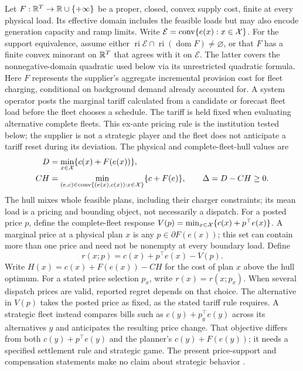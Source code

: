Let $F:\mathbb R^T\to\mathbb R\cup\{+\infty\}$ be a proper, closed, convex supply cost,
finite at every physical load.  Its effective domain includes the feasible
loads but may also encode generation capacity and ramp limits.  Write
$\mathcal E=\operatorname{conv}\{e(x):x\in\mathcal X\}$.  For the support
equivalence, assume either
$\operatorname{ri}\mathcal E\cap\operatorname{ri}(\operatorname{dom}F)
\ne\varnothing$, or that $F$ has a finite convex minorant on $\mathbb R^T$ that
agrees with it on $\mathcal E$.  The latter covers the nonnegative-domain
quadratic used below via its unrestricted quadratic formula.
Here $F$ represents the supplier's aggregate incremental provision cost for
fleet charging, conditional on background demand already accounted for. A
system operator posts the marginal tariff calculated from a candidate or
forecast fleet load before the fleet chooses a schedule. The tariff is held
fixed when evaluating alternative complete fleets. This ex-ante pricing rule
is the institution tested below; the supplier is not a strategic player and
the fleet does not anticipate a tariff reset during its deviation.
The physical and complete-fleet-hull values are
\begin{equation}\label{eq:theory-values}
\begin{aligned}
 D&=\min_{x\in\mathcal X}\{c(x)+F(e(x))\},\\
 CH&=\min_{(e,c)\in\operatorname{conv}\{(e(x),c(x)):x\in\mathcal X\}}
       \{c+F(e)\},\qquad \Delta=D-CH\geq0.
\end{aligned}
\end{equation}
The hull mixes whole feasible plans, including their charger constraints;
its mean load is a pricing and bounding object, not necessarily a dispatch.
For a posted price $p$, define the complete-fleet response
$V(p)=\min_{x\in\mathcal X}\{c(x)+p^\top e(x)\}$.  A marginal price at a
physical plan $x$ is any $p\in\partial F(e(x))$; this set can contain more
than one price and need not be nonempty at every boundary load.  Define
\begin{equation}\label{eq:theory-regret}
 r(x;p)=c(x)+p^\top e(x)-V(p).
\end{equation}
Write $H(x)=c(x)+F(e(x))-CH$ for the cost of plan $x$ above the hull
optimum. For a stated price selection $p_x$, write $r(x)=r(x;p_x)$.
When several dispatch prices are valid, reported regret depends on that choice.
The alternative in $V(p)$ takes the posted price as fixed, as the stated
tariff rule requires.  A strategic fleet instead compares bills such as
$c(y)+p_y^\top e(y)$ across its alternatives $y$ and anticipates
the resulting price change.  That objective differs from both
$c(y)+p^\top e(y)$ and the planner's $c(y)+F(e(y))$; it needs a specified
settlement rule and strategic game.  The present price-support and
compensation statements make no claim about strategic behavior
\citep{oneill2005,gribikHoganPope2007,ganTopcuLow2013}.

